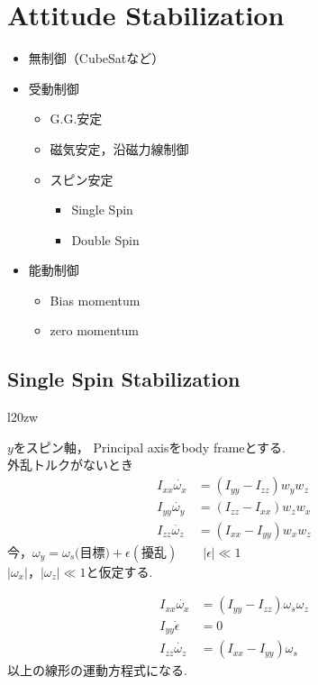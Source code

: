 \documentclass[class=article, crop=false, dvipdfmx]{standalone}
\begin{document}
\section{Attitude Stabilization}
\renewcommand{\labelitemi}{---}
\begin{itemize}
\item 無制御（CubeSatなど）
\item 受動制御
	\begin{itemize}
    \item G.G.安定
    \item 磁気安定，沿磁力線制御
    \item スピン安定
    	\begin{itemize}
        \item Single Spin
        \item Double Spin
        \end{itemize}
    \end{itemize}
\item 能動制御
	\begin{itemize}
    \item Bias momentum
    \item zero momentum
    \end{itemize}
\end{itemize}
\renewcommand{\labelitemi}{\textbullet}


\subsection{Single Spin Stabilization}

\begin{wrapfigure}{l}{20zw}

\end{wrapfigure}

$y$をスピン軸，
Principal axisをbody frameとする.\\
外乱トルクがないとき
\begin{align}
I_{xx}\dot{\omega_x}&=(I_{yy}-I_{zz})w_yw_z\\
I_{yy}\dot{\omega_y}&=(I_{zz}-I_{xx})w_zw_x\\
I_{zz}\dot{\omega_z}&=(I_{xx}-I_{yy})w_xw_z
\end{align}
今，$\omega_y=\omega_s(\mbox{目標)}+\epsilon(\mbox{擾乱})\qquad |\epsilon| \ll 1$\\
$|\omega_x|，|\omega_z| \ll 1$と仮定する.

\begin{align}
I_{xx}\dot{\omega_x} &= (I_{yy}-I_{zz})\omega_s\omega_z\\
I_{yy}\dot{\epsilon} &= 0 \\
I_{zz}\dot{\omega_z} &= (I_{xx}-I_{yy})\omega_s
\end{align}
以上の線形の運動方程式になる.
\end{document}
